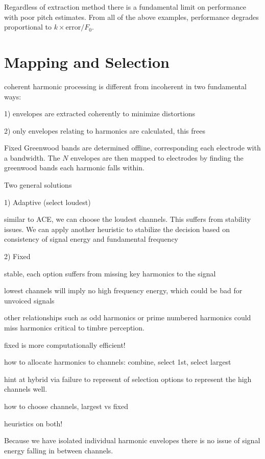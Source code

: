 \documentclass [11pt, proquest,oneside] {ganter_thesis}[2015/03/03]
\begin{document}
Regardless of extraction method there is a fundamental limit on performance with poor pitch estimates.  From all of the above examples, performance degrades proportional to $k \times \mathrm{error} / F_0$.


\section{Mapping and Selection}

coherent harmonic processing is different from incoherent in two fundamental ways:

1) envelopes are extracted coherently to minimize distortions

2) only envelopes relating to harmonics are calculated, this frees 

Fixed Greenwood bands are determined offline, corresponding each electrode with a bandwidth.  The $N$ envelopes are then mapped to electrodes by finding the greenwood bands each harmonic falls within.

Two general solutions

1) Adaptive (select loudest)

similar to ACE, we can choose the loudest channels.  This suffers from stability issues.  We can apply another heuristic to stabilize the decision based on consistency of signal energy and fundamental frequency

2) Fixed

stable, each option suffers from missing key harmonics to the signal

lowest channels will imply no high frequency energy, which could be bad for unvoiced signals

other relationships such as odd harmonics or prime numbered harmonics could miss harmonics critical to timbre perception.

fixed is more computationally efficient!


how to allocate harmonics to channels: combine, select 1st, select largest

hint at hybrid via failure to represent of selection options to represent the high channels well.

how to choose channels, largest vs fixed

heuristics on both!

Because we have isolated individual harmonic envelopes there is no issue of signal energy falling in between channels.
\end{document}
